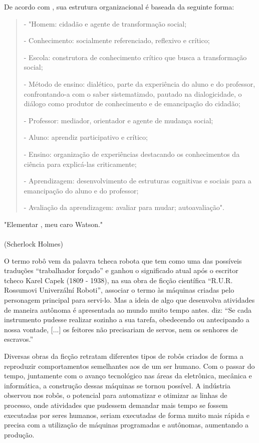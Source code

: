 De acordo com \cite{larchert}, sua estrutura organizacional é baseada da seguinte forma:
\begin{quote}- "Homem: cidadão e agente de transformação social;
	
- Conhecimento: socialmente referenciado, reflexivo e crítico;

- Escola: construtora de conhecimento crítico que busca a transformação social;

- Método de ensino: dialético, parte da experiência do aluno e do professor, confrontando-a com o saber sistematizado, pautado na dialogicidade, o diálogo como produtor de conhecimento e de emancipação do cidadão;

- Professor: mediador, orientador e agente de mudança social;

- Aluno: aprendiz participativo e crítico;

- Ensino: organização de experiências destacando os conhecimentos da ciência para explicá-las criticamente;

- Aprendizagem: desenvolvimento de estruturas cognitivas e sociais para a emancipação do aluno e do professor;

- Avaliação da aprendizagem: avaliar para mudar; autoavaliação".
\end{quote}


\begin{flushright}
	"Elementar , meu caro Watson." \\
	\ \\
	(Scherlock Holmes)
\end{flushright}

O termo robô vem da palavra tcheca robota que tem como uma das possíveis traduções “trabalhador forçado” e ganhou o significado atual após o escritor tcheco Karel Capek (1809 - 1938), na sua obra de ficção científica “R.U.R. Rossumovi Univerzální Roboti”, associar o termo às máquinas criadas pelo personagem principal para servi-lo. Mas a ideia de algo que desenvolva atividades de maneira autônoma é apresentada ao mundo muito tempo antes. \cite{aristoteles1985traduccao} diz: “Se cada instrumento pudesse realizar sozinho a sua tarefa, obedecendo ou antecipando a nossa vontade, [...] os feitores não precisariam de servos, nem os senhores de escravos.” 

Diversas obras da ficção retratam diferentes tipos de robôs criados de forma a reproduzir comportamentos semelhantes aos de um ser humano. Com o passar do tempo, juntamente com o avanço tecnológico nas áreas da eletrônica, mecânica e informática, a construção dessas máquinas se tornou possível. A indústria observou nos robôs, o potencial para automatizar e otimizar as linhas de processo, onde atividades que pudessem demandar mais tempo se fossem executadas por seres humanos, seriam executadas de forma muito mais rápida e precisa com a utilização de máquinas programadas e autônomas, aumentando a produção.

